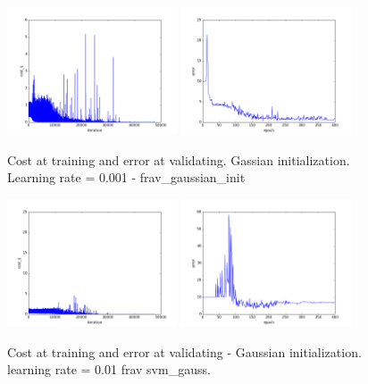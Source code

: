 \begin{figure}[htb]
\centering
\includegraphics[width=0.45\textwidth]{images/FRAv_casia_ImageNet/Imagenet2/frav/frav_gaussian_init/cost_frav.png}
\includegraphics[width=0.45\textwidth]{images/FRAv_casia_ImageNet/Imagenet2/frav/frav_gaussian_init/error_frav.png}
\caption{Cost at training and error at validating. Gassian initialization. Learning rate = 0.001 - frav\_gaussian\_init} \label{fig:Imagenet2-frav_gaussian_init}
\end{figure}

\begin{figure}[htb]
\centering
\includegraphics[width=0.45\textwidth]{images/FRAv_casia_ImageNet/Imagenet2/frav/svm_gauss/cost.png}
\includegraphics[width=0.45\textwidth]{images/FRAv_casia_ImageNet/Imagenet2/frav/svm_gauss/error.png}
\caption{Cost at training and error at validating - Gaussian initialization. learning rate = 0.01 frav svm\_gauss.} \label{fig:Imagenet2-frav-svm_gauss}
\end{figure}

